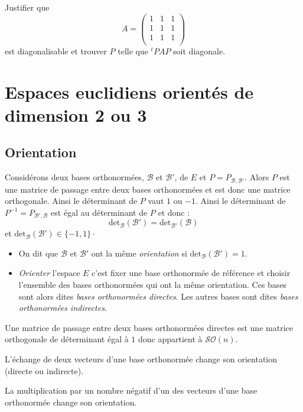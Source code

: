 \documentclass[a4paper,10pt]{report}
\begin{document}
\begin{exa} Justifier que
  \[
  A =
  \begin{pmatrix}
    1 &  1 &  1 \\
  1 &  1 &  1 \\
    1 &  1 &  1 \\
  \end{pmatrix}
  \]
est diagonalisable et trouver $P$ telle que $^tPAP$ soit diagonale.
\end{exa}



\section{Espaces euclidiens orientés de dimension 2 ou 3}
\subsection{Orientation}
\noindent Considérons deux bases orthonormées, $\mathcal{B}$ et $\mathcal{B}'$, de $E$ et $P= P_{\mathcal{B}, \mathcal{B}'}$. Alors $P$ est une matrice de passage entre deux bases orthonormées et est donc une matrice orthogonale. Ainsi le déterminant de $P$ vaut $1$ ou $-1$. Ainsi le déterminant de $P^{-1}= P_{\mathcal{B}', \mathcal{B}}$ est égal au déterminant de $P$ et donc :
$$ \textrm{det}_{\mathcal{B}}(\mathcal{B}') =  \textrm{det}_{\mathcal{B}'}(\mathcal{B})$$
et $\textrm{det}_{\mathcal{B}}(\mathcal{B}')  \in \lbrace -1,1 \rbrace \cdot$

\begin{defin}
\begin{itemize}
\item On dit que $\mathcal{B}$ et $\mathcal{B}'$ ont la même \textit{orientation} si $\textrm{det}_{\mathcal{B}}(\mathcal{B}')=1$.
\item \textit{Orienter} l'espace $E$ c'est fixer une base orthonormée de référence et choisir l'ensemble des bases orthonormées qui ont la même orientation. Ces bases sont alors dites \textit{bases orthonormées directes}. Les autres bases sont dites \textit{bases orthonormées indirectes}.
\end{itemize}
\end{defin}

\begin{rems}
\item Une matrice de passage entre deux bases orthonormées directes est une matrice orthogonale de déterminant égal à $1$ donc appartient à $\mathcal{SO}(n)$.
\item L'échange de deux vecteurs d'une base orthonormée change son orientation (directe ou indirecte).
\item La multiplication par un nombre négatif d'un des vecteurs d'une base orthonormée change son orientation.
\end{rems}
\end{document}
